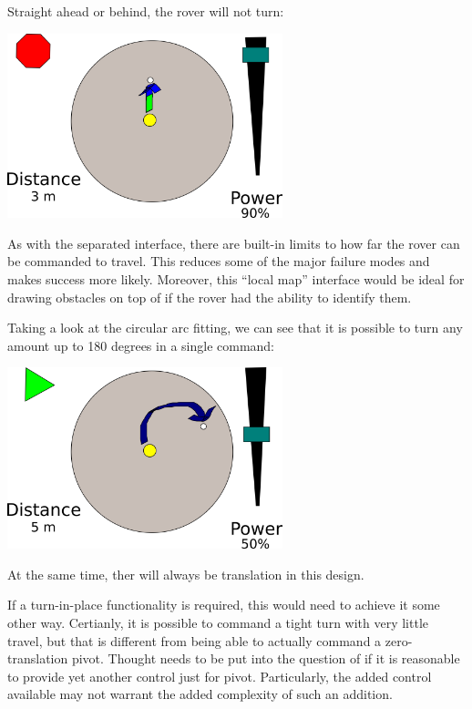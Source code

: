 \documentclass[letterpaper,10pt]{article}
\begin{document}
    Straight ahead or behind, the rover will not turn:
    
    \includegraphics[width=8cm]{basic_arc_forward_running}
    
    As with the separated interface, there are built-in limits to how far the rover can be commanded to travel.  This reduces some of the major failure modes and makes success more likely.  Moreover, this ``local map'' interface would be ideal for drawing obstacles on top of if the rover had the ability to identify them.
    
    Taking a look at the circular arc fitting, we can see that it is possible to turn any amount up to 180 degrees in a single command:
    
    \includegraphics[width=8cm]{basic_arc_turning}
    
    At the same time, ther will always be translation in this design.
    
    
    
    If a turn-in-place functionality is required, this would need to achieve it some other way.  Certianly, it is possible to command a tight turn with very little travel, but that is different from being able to actually command a zero-translation pivot.  Thought needs to be put into the question of if it is reasonable to provide yet another control just for pivot.  Particularly, the added control available may not warrant the added complexity of such an addition.
    
\end{document}

